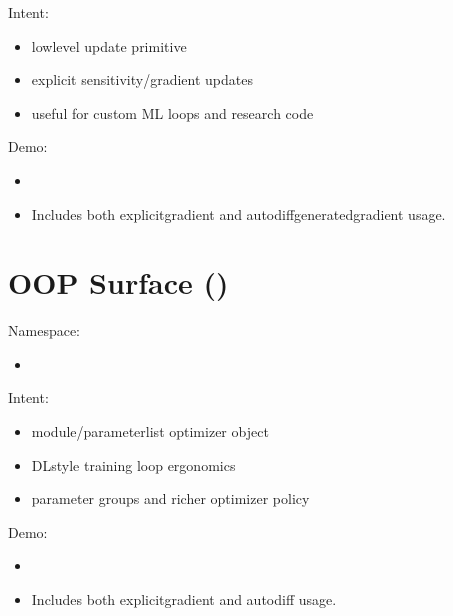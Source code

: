 \documentclass[letterpaper,10pt,english]{sphinxmanual}
\begin{document}
\sphinxAtStartPar
Intent:
\begin{itemize}
\item {} 
\sphinxAtStartPar
low\sphinxhyphen{}level  update primitive

\item {} 
\sphinxAtStartPar
explicit sensitivity/gradient updates

\item {} 
\sphinxAtStartPar
useful for custom ML loops and research code

\end{itemize}

\sphinxAtStartPar
Demo:
\begin{itemize}
\item {} 
\sphinxAtStartPar
{}

\item {} 
\sphinxAtStartPar
Includes both explicit\sphinxhyphen{}gradient and autodiff\sphinxhyphen{}generated\sphinxhyphen{}gradient usage.

\end{itemize}


\section{OOP Surface ()}
\label{\detokenize{optimizer_surfaces:oop-surface-plussai}}
\sphinxAtStartPar
Namespace:
\begin{itemize}
\item {} 
\sphinxAtStartPar
{}

\end{itemize}

\sphinxAtStartPar
Intent:
\begin{itemize}
\item {} 
\sphinxAtStartPar
module/parameter\sphinxhyphen{}list optimizer object

\item {} 
\sphinxAtStartPar
DL\sphinxhyphen{}style training loop ergonomics

\item {} 
\sphinxAtStartPar
parameter groups and richer optimizer policy

\end{itemize}

\sphinxAtStartPar
Demo:
\begin{itemize}
\item {} 
\sphinxAtStartPar
{}

\item {} 
\sphinxAtStartPar
Includes both explicit\sphinxhyphen{}gradient  and autodiff  usage.

\end{itemize}
\end{document}

